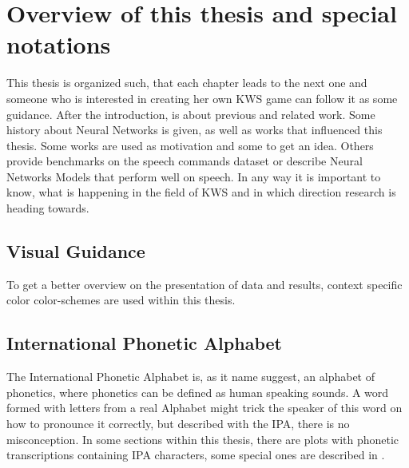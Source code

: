 
\section{Overview of this thesis and special notations}\label{intro_overview}

This thesis is organized such, that each chapter leads to the next one and someone who is interested in creating her own KWS game can
follow it as some guidance.
After the introduction,  is about previous and related work.
Some history about Neural Networks is given, as well as works that influenced this thesis.
Some works are used as motivation and some to get an idea.
Others provide benchmarks on the speech commands dataset or describe Neural Networks Models that perform well on speech.
In any way it is important to know, what is happening in the field of KWS and in which direction research is heading towards.

\subsection{Visual Guidance}
To get a better overview on the presentation of data and results, context specific color color-schemes are used within this thesis.


\subsection{International Phonetic Alphabet}
The International Phonetic Alphabet is, as it name suggest, an alphabet of phonetics, where phonetics can be defined as human speaking sounds.
A word formed with letters from a real Alphabet might trick the speaker of this word on how to pronounce it correctly, but described with the IPA, there is no misconception.
In some sections within this thesis, there are plots with phonetic transcriptions containing IPA characters, some special ones are described in .


